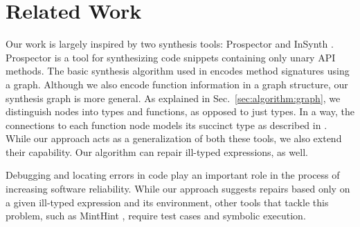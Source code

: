 \section{Related Work}
\label{sec:related}

Our work is largely inspired by two synthesis tools: Prospector \cite{MandelinetALL2005Jungloid} and InSynth \cite{GveroETAL13CompleteCompletionTypesWeights, DBLP:conf/cav/GveroKP11}. Prospector is a tool for synthesizing code snippets containing only unary API methods. The basic synthesis algorithm used in \cite{MandelinetALL2005Jungloid} encodes method signatures using a graph. Although we also encode function information in a graph structure, our synthesis graph is more general. As explained in Sec.~\ref{sec:algorithm:graph}, we distinguish nodes into types and functions, as opposed to just types. In a way, the connections to each function node models its succinct type as described in \cite{GveroETAL13CompleteCompletionTypesWeights}. While our approach acts as a generalization of both these tools, we also extend their capability. Our algorithm can repair ill-typed expressions, as well.

Debugging and locating errors in code \cite{Pavlinovic:2014, Chandra:2011:AD} play an important role in the process of increasing software reliability. While our approach suggests repairs based only on a given ill-typed expression and its environment, other tools that tackle this problem, such as MintHint \cite{MintHint}, require test cases and symbolic execution.

